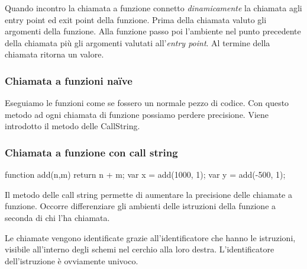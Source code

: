 Quando incontro la chiamata a funzione connetto \emph{dinamicamente} la chiamata agli entry point ed exit point della funzione. Prima della chiamata valuto gli argomenti della funzione. Alla funzione passo poi l'ambiente nel punto precedente della chiamata più gli argomenti valutati all'\emph{entry point}. Al termine della chiamata ritorna un valore. 

\subsubsection{Chiamata a funzioni na\"ive} 

Eseguiamo le funzioni come se fossero un normale pezzo di codice. Con questo metodo ad ogni chiamata di funzione possiamo perdere precisione. Viene introdotto il metodo delle CallString.

\subsubsection{Chiamata a funzione con call string}\label{sec:callstring:internal}
\begin{javascriptcode}
function add(n,m) {
    return n + m;
}
var x = add(1000, 1);
var y = add(-500, 1);
\end{javascriptcode}
Il metodo delle call string permette di aumentare la precisione delle chiamate a funzione. Occorre differenziare gli ambienti delle istruzioni della funzione a seconda di chi l'ha chiamata.

Le chiamate vengono identificate grazie all'identificatore che hanno le istruzioni, visibile all'interno degli schemi nel cerchio alla loro destra. L'identificatore dell'istruzione è ovviamente univoco.

